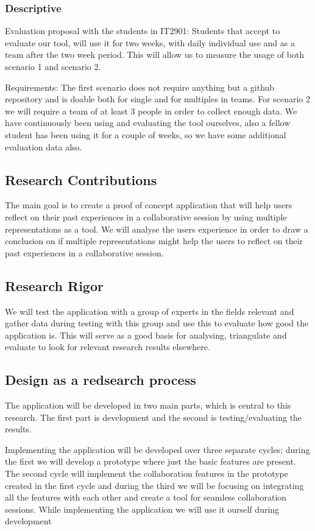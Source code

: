 \subsubsection{Descriptive}
Evaluation proposal with the students in IT2901: 
Students that accept to evaluate our tool, will use it for two weeks, with daily individual use and as a team after the two week period. This will allow us to measure the
usage of both scenario 1 and scenario 2.

Requirements: 
The first scenario does not require anything but a github repository and is doable both for single and for multiples in teams.
For scenario 2 we will require a team of at least 3 people in order to collect enough data. 
We have continuously been using and evaluating the tool ourselves, also a fellow student has been using it for a couple of weeks, so we have some additional evaluation
data also.

\subsection{Research Contributions}
The main goal is to create a proof of concept application that will help users reflect on their past experiences in a collaborative session by using multiple representations as a tool. 
We will analyse the users experience in order to draw a conclusion on if multiple representations might help the users to reflect on their past experiences in a collaborative session.

\subsection{Research Rigor}
 We will test the application with a group of experts in the fields relevant and gather data during testing with this group and use this to evaluate how good the application is. This will serve as a good basis for analysing, triangulate and evaluate to look for relevant research results elsewhere.

\subsection{Design as a redsearch process}
The application will be developed in two main parts, which is central to this research. The first part is development and the second is testing/evaluating the results.

Implementing the application will be developed over three separate cycles; during the first we will develop a prototype where just the basic features are present. The second cycle will implement the collaboration features in the prototype created in the first cycle and during the third we will be focusing on integrating all the features with each other and create a tool for seamless collaboration sessions. While implementing the application we will use it ourself during development

